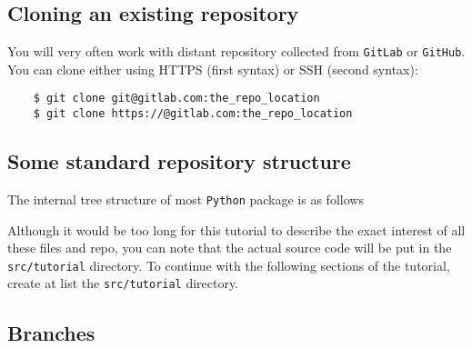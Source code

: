 \documentclass{article}
\begin{document}
\subsection{Cloning an existing repository}

You will very often work with distant repository collected from \texttt{GitLab} or \texttt{GitHub}. You can clone either using HTTPS (first syntax) or SSH (second syntax):

\begin{lstlisting}
    $ git clone git@gitlab.com:the_repo_location
    $ git clone https://@gitlab.com:the_repo_location
\end{lstlisting}

\subsection{Some standard repository structure}

The internal tree structure of most \texttt{Python} package is as follows 

Although it would be too long for this tutorial to describe the exact interest of all these files and repo, you can note that the actual source code will be put in the \texttt{src/tutorial} directory. To continue with the following sections of the tutorial, create at list the \texttt{src/tutorial} directory.

\subsection{Branches}
\end{document}
